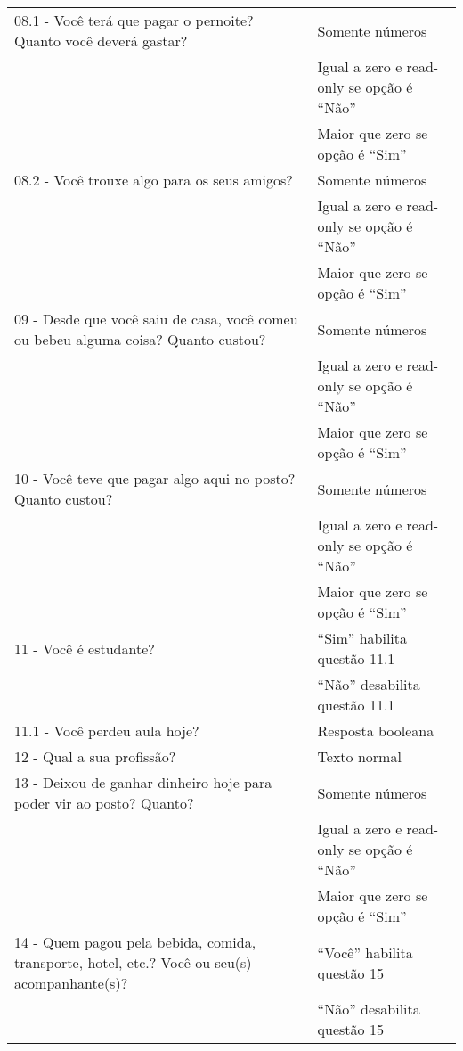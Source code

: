 \begin{longtable}{p{}|p{}}
08.1 - Você terá que pagar o pernoite? Quanto você deverá gastar? & Somente números \\ \cline{2-2} & Igual a zero e read-only se opção é ``Não'' \\ \cline{2-2} & Maior que zero se opção é ``Sim'' \\ \hline

08.2 - Você trouxe algo para os seus amigos? & Somente números \\ \cline{2-2} & Igual a zero e read-only se opção é ``Não'' \\ \cline{2-2} & Maior que zero se opção é ``Sim'' \\ \hline

09 - Desde que você saiu de casa, você comeu ou bebeu alguma coisa? Quanto custou? & Somente números \\ \cline{2-2} & Igual a zero e read-only se opção é ``Não'' \\ \cline{2-2} & Maior que zero se opção é ``Sim'' \\ \hline

10 - Você teve que pagar algo aqui no posto? Quanto custou? & Somente números \\ \cline{2-2} & Igual a zero e read-only se opção é ``Não'' \\ \cline{2-2} & Maior que zero se opção é ``Sim'' \\ \hline

11 - Você é estudante? & ``Sim'' habilita questão 11.1 \\ \cline{2-2} &  ``Não'' desabilita questão 11.1  \\ \hline

11.1 - Você perdeu aula hoje? & Resposta booleana \\ \hline

12 - Qual a sua profissão? & Texto normal \\ \hline

13 - Deixou de ganhar dinheiro hoje para poder vir ao posto? Quanto? & Somente números \\ \cline{2-2} & Igual a zero e read-only se opção é ``Não'' \\ \cline{2-2} & Maior que zero se opção é ``Sim'' \\ \hline

14 - Quem pagou pela bebida, comida, transporte, hotel, etc.? Você ou seu(s) acompanhante(s)? & ``Você'' habilita questão 15  \\ \cline{2-2} & ``Não'' desabilita questão 15 \\ \hline


\end{longtable}

